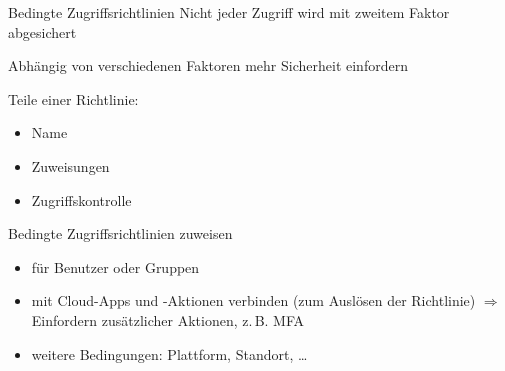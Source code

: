 \begin{flashcard}[Definition]{Bedingte Zugriffsrichtlinien}
    Nicht jeder Zugriff wird mit zweitem Faktor abgesichert

    \vspace{1cm}
    Abhängig von verschiedenen Faktoren mehr Sicherheit einfordern

    \vspace{1cm}
    Teile einer Richtlinie:
    \begin{itemize}
        \item Name
        \item Zuweisungen
        \item Zugriffskontrolle
    \end{itemize}

\end{flashcard}

\begin{flashcard}[Definition]{Bedingte Zugriffsrichtlinien zuweisen}
    \begin{itemize}
        \item für Benutzer oder Gruppen
        \item mit Cloud-Apps und -Aktionen verbinden (zum Auslösen der Richtlinie)\newline
            $\Rightarrow$ Einfordern zusätzlicher Aktionen, z.\,B. MFA
        \item weitere Bedingungen:\newline
            Plattform, Standort, \ldots
    \end{itemize}
\end{flashcard}

